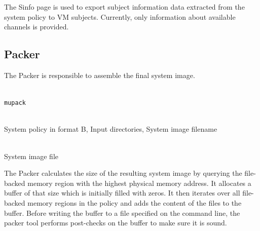 \documentclass[a4paper,twoside,titlepage]{article}
\begin{document}
The Sinfo page is used to export subject information data extracted from the
system policy to VM subjects.  Currently, only information about available
channels is provided.

\subsection{Packer}
\label{sec:tools-packer}
The Packer is responsible to assemble the final system image.

\begin{description} \itemsep1pt \parskip0pt
	\item[Name] \hfill \\
		\texttt{mupack}
	\item[Input] \hfill \\
		System policy in format B, Input directories, System image filename
	\item[Output] \hfill \\
		System image file
\end{description}

The Packer calculates the size of the resulting system image by querying the
file-backed memory region with the highest physical memory address. It
allocates a buffer of that size which is initially filled with zeros. It then
iterates over all file-backed memory regions in the policy and adds the content
of the files to the buffer. Before writing the buffer to a file specified on
the command line, the packer tool performs post-checks on the buffer to make
sure it is sound.
\end{document}
